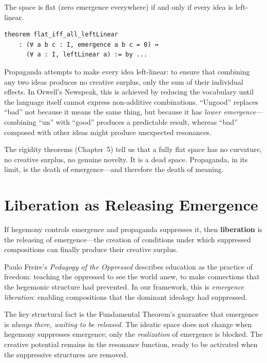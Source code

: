 \begin{theorem}
\label{thm:flat-linear}
The space is flat (zero emergence everywhere) if and only if every idea is
left-linear.
\end{theorem}

\begin{lstlisting}[caption={Flatness and linearity (IDT\_v3\_Emergence.lean)}]
theorem flat_iff_all_leftLinear
    : (∀ a b c : I, emergence a b c = 0) ↔
      (∀ a : I, leftLinear a) := by ...
\end{lstlisting}

\begin{interpretation}
Propaganda attempts to make every idea left-linear: to ensure that combining any
two ideas produces no creative surplus, only the sum of their individual effects.
In Orwell's Newspeak, this is achieved by reducing the vocabulary until the
language itself cannot express non-additive combinations. ``Ungood'' replaces
``bad'' not because it means the same thing, but because it has \emph{lower
emergence}---combining ``un'' with ``good'' produces a predictable result, whereas
``bad'' composed with other ideas might produce unexpected resonances.

The rigidity theorems (Chapter~5) tell us that a fully flat space has no
curvature, no creative surplus, no genuine novelty. It is a dead space. Propaganda,
in its limit, is the death of emergence---and therefore the death of meaning.
\end{interpretation}


\section{Liberation as Releasing Emergence}

If hegemony controls emergence and propaganda suppresses it, then \textbf{liberation}
is the releasing of emergence---the creation of conditions under which suppressed
compositions can finally produce their creative surplus.

Paulo Freire's \emph{Pedagogy of the Oppressed} describes education as the
practice of freedom: teaching the oppressed to see the world anew, to make
connections that the hegemonic structure had prevented. In our framework, this
is \emph{emergence liberation}: enabling compositions that the dominant ideology
had suppressed.

The key structural fact is the Fundamental Theorem's guarantee that emergence
is \emph{always there, waiting to be released}. The ideatic space does not
change when hegemony suppresses emergence; only the \emph{realization} of
emergence is blocked. The creative potential remains in the resonance function,
ready to be activated when the suppressive structures are removed.

